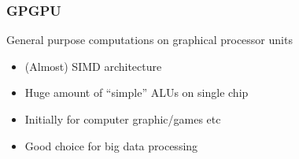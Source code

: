 \documentclass[xcolor=table]{beamer}
\begin{document}
\begin{frame}[fragile]
  \transwipe[direction=90]
  \frametitle{GPGPU}
  \begin{minipage}[m]{0.40\linewidth}
\end{minipage}\hfill
\begin{minipage}[m]{0.6\linewidth}
General purpose computations on graphical processor units
\begin{itemize}
      \item (Almost) SIMD architecture 
      \item Huge amount of ``simple'' ALUs on single chip
	  \item Initially for computer graphic/games etc
      \item Good choice for big data processing	  
\end{itemize}

\end{minipage}

\end{frame}
\end{document}
